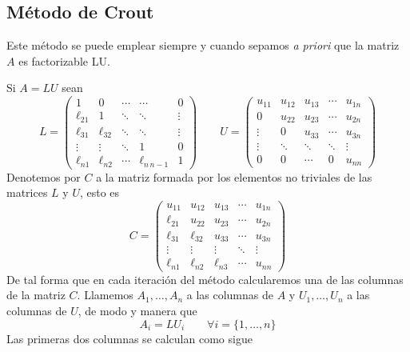     \subsection{Método de Crout}
\begin{obs}
Este método se puede emplear siempre y cuando sepamos \textit{a priori} que la matriz $A$ es factorizable LU.
\end{obs}
\begin{met}
Si $A=LU$ sean 
$$L=\begin{pmatrix}
    1&0&\cdots&\cdots& 0\\
    \ell_{21}& 1 & \ddots & \ddots &\vdots\\
    \ell_{31}&\ell_{32}&\ddots& \ddots &\vdots \\
    \vdots&\vdots&\ddots &1 & 0\\
    \ell_{n1}&\ell_{n2}&\cdots& \ell_{n\, n-1}& 1 
\end{pmatrix} \qquad 
U=\begin{pmatrix}
    u_{11}&u_{12}&u_{13}&\cdots &u_{1n}\\
    0&u_{22}&u_{23}&\cdots &u_{2n}\\
    \vdots & 0&u_{33}&\cdots&u_{3n}\\
    \vdots&\ddots &\ddots&\ddots&\vdots \\
    0&0&\cdots&0&u_{nn}
\end{pmatrix}$$
Denotemos por $C$ a la matriz formada por los elementos no triviales de las matrices $L$ y $U$, esto es
$$C=\begin{pmatrix}
    u_{11}&u_{12}&u_{13}&\cdots &u_{1n}\\
    \ell_{21}&u_{22}&u_{23}&\cdots &u_{2n}\\
    \ell_{31} & \ell_{32}&u_{33}&\cdots&u_{3n}\\
    \vdots&\vdots &\vdots&\ddots&\vdots \\
    \ell_{n1}&\ell_{n2} &\ell_{n3}&\cdots&u_{nn}
\end{pmatrix}$$
De tal forma que en cada iteración del método calcularemos una de las columnas de la matriz $C$. Llamemos $A_1,\ldots, A_n$ a las columnas de $A$ y $U_1, \ldots, U_n$ a las columnas de $U$, de modo y manera que $$A_i=LU_i \qquad \forall i=\{1,\ldots,n\} $$
Las primeras dos columnas se calculan como sigue


\end{met}
